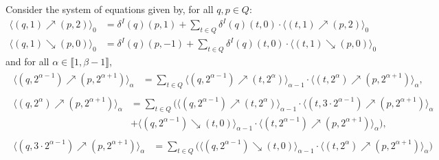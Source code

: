 \documentclass[a4paper,UKenglish,cleveref,autoref,thm-restate,colorlinks]{lipics-v2021}
\newcommand{\integerInterval}[1]{\llbracket{}#1\rrbracket{}}
\newcommand{\ocStateSpace}{Q}
\newcommand{\ocState}{q}
\newcommand{\ocStateB}{p}
\newcommand{\ocStateC}{t}
\newcommand{\ocTrans}{\delta}
\newcommand{\interval}{I}
\newcommand{\powerIndex}{\alpha}
\newcommand{\powerMax}{\beta}
\newcommand{\upProbaVar}[5]{\langle (#1,#2)\nearrow{}(#3,#4)\rangle_{#5}}
\newcommand{\downProbaVar}[5]{\langle (#1,#2)\searrow{}(#3,#4)\rangle_{#5}}
\begin{document}
\begin{theorem}
  Consider the system of equations given by, for all $\ocState, \ocStateB\in\ocStateSpace$:
  \begin{align}
    \upProbaVar{\ocState}{1}{\ocStateB}{2}{0} & =
    \ocTrans^\interval(\ocState)(\ocStateB, 1) +
    \sum_{\ocStateC\in\ocStateSpace} \ocTrans^\interval(\ocState)(\ocStateC, 0)\cdot\upProbaVar{\ocStateC}{1}{\ocStateB}{2}{0}\label{equation:transitions:up:zero} \\
    \downProbaVar{\ocState}{1}{\ocStateB}{0}{0} & =
    \ocTrans^\interval(\ocState)(\ocStateB, -1) +
    \sum_{\ocStateC\in\ocStateSpace} \ocTrans^\interval(\ocState)(\ocStateC, 0)\cdot\downProbaVar{\ocStateC}{1}{\ocStateB}{0}{0}\nonumber
  \end{align}
  and for all $\powerIndex\in\integerInterval{1, \powerMax-1}$,
  \begin{align}
    \begin{split}
      \upProbaVar{\ocState}{2^{\powerIndex-1}}{\ocStateB}{2^{\powerIndex+1}}{\powerIndex} & = 
      \sum_{\ocStateC\in\ocStateSpace}
      \upProbaVar{\ocState}{2^{\powerIndex-1}}{\ocStateC}{2^{\powerIndex}}{\powerIndex-1}
      \cdot
      \upProbaVar{\ocStateC}{2^{\powerIndex}}{\ocStateB}{2^{\powerIndex+1}}{\powerIndex},
    \end{split}\label{equation:transitions:up:first}\\
    \begin{split}
      \upProbaVar{\ocState}{2^{\powerIndex}}{\ocStateB}{2^{\powerIndex+1}}{\powerIndex} & =      
      \sum_{\ocStateC\in\ocStateSpace}\bigg(
      \upProbaVar{\ocState}{2^{\powerIndex-1}}{\ocStateC}{2^{\powerIndex}}{\powerIndex-1}
      \cdot 
      \upProbaVar{\ocStateC}{3\cdot2^{\powerIndex-1}}{\ocStateB}{2^{\powerIndex+1}}{\powerIndex} \\
      &
      +
      \downProbaVar{\ocState}{2^{\powerIndex-1}}{\ocStateC}{0}{\powerIndex-1}
      \cdot 
      \upProbaVar{\ocStateC}{2^{\powerIndex-1}}{\ocStateB}{2^{\powerIndex+1}}{\powerIndex}
      \bigg),
    \end{split}\label{equation:transitions:up:second} \\
    \begin{split}
      \upProbaVar{\ocState}{3\cdot 2^{\powerIndex-1}}{\ocStateB}{2^{\powerIndex+1}}{\powerIndex} & =
      \sum_{\ocStateC\in\ocStateSpace}\bigg(
      \downProbaVar{\ocState}{2^{\powerIndex-1}}{\ocStateC}{0}{\powerIndex-1}
      \cdot
      \upProbaVar{\ocStateC}{2^{\powerIndex}}{\ocStateB}{2^{\powerIndex+1}}{\powerIndex}
      \bigg)
      \\

\end{split}
\end{align}
\end{theorem}
\end{document}
